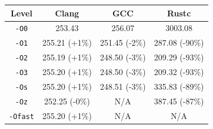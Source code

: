 \begin{tabular*}{\columnwidth}{@{\extracolsep\fill}cccc@{\extracolsep\fill}}
\toprule
\textbf{Level} & \textbf{Clang} & \textbf{GCC} & \textbf{Rustc} \\
\midrule
\texttt{-O0} & 253.43 & 256.07 & 3003.08 \\
\texttt{-O1} & 255.21 (+1\%) & 251.45 (-2\%) & 287.08 (-90\%) \\
\texttt{-O2} & 255.19 (+1\%) & 248.50 (-3\%) & 209.29 (-93\%) \\
\texttt{-O3} & 255.20 (+1\%) & 248.50 (-3\%) & 209.32 (-93\%) \\
\texttt{-Os} & 255.20 (+1\%) & 248.51 (-3\%) & 335.83 (-89\%) \\
\texttt{-Oz} & 252.25 (-0\%) & N/A & 387.45 (-87\%) \\
\texttt{-Ofast} & 255.20 (+1\%) & N/A & N/A \\
\bottomrule
\end{tabular*}
